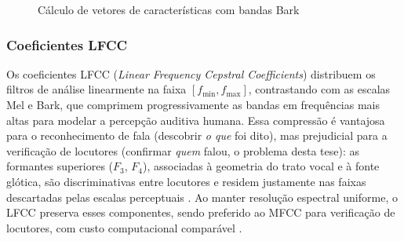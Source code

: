 			\begin{figure}[h]
				\centering
				\caption{Cálculo de vetores de características com bandas Bark}
				\resizebox{0.6\linewidth}{!}{}
				\label{fig:barkfeaturevect}
			\end{figure}
			
		\subsubsection{Coeficientes LFCC}

			\par Os coeficientes LFCC (\textit{Linear Frequency Cepstral Coefficients}) distribuem os filtros de análise linearmente na faixa $[f_{\min}, f_{\max}]$, contrastando com as escalas Mel e Bark, que comprimem progressivamente as bandas em frequências mais altas para modelar a percepção auditiva humana. Essa compressão é vantajosa para o reconhecimento de fala (descobrir \emph{o que} foi dito), mas prejudicial para a verificação de locutores (confirmar \emph{quem} falou, o problema desta tese): as formantes superiores ($F_3$, $F_4$), associadas à geometria do trato vocal e à fonte glótica, são discriminativas entre locutores e residem justamente nas faixas descartadas pelas escalas perceptuais \cite{zhou2011lfcc,Hanilci2018}. Ao manter resolução espectral uniforme, o LFCC preserva esses componentes, sendo preferido ao MFCC para verificação de locutores, com custo computacional comparável \cite{ali2022speech}.

